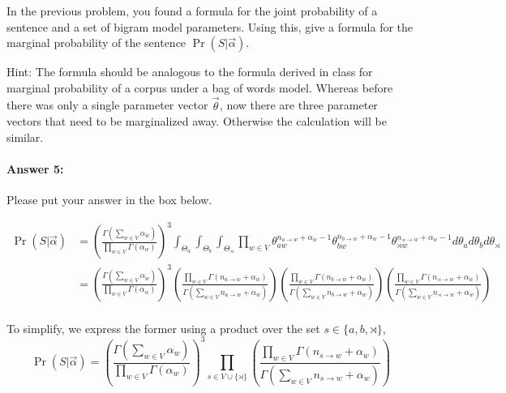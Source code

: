 \documentclass[10pt]{article}
\newenvironment{AnswerBox}{\begin{mdframed}[style=simple]}{\end{mdframed}}
\begin{document}
In the previous problem, you found a formula for the joint probability
of a sentence and a set of bigram model parameters. Using this, give a
formula for the marginal probability of the sentence
$\Pr(S|\vec{\alpha})$.

 Hint: The formula should be analogous to the formula derived
in class for marginal probability of a corpus under a bag of words
model. Whereas before there was only a single parameter vector
$\vec{\theta}$, now there are three parameter vectors that need to be
marginalized away. Otherwise the calculation will be similar.

\paragraph{Answer 5:} Please put your answer in the box below.


\begin{AnswerBox}%

\begin{align*}
    \Pr(S|\vec{\alpha}) & =  \left (\frac{\Gamma (\sum_{w\in V} \alpha_{w})}{\prod_{w\in V} \Gamma (\alpha_{w})}\right )^3 
    \int_{\Theta_{a}} \int_{\Theta_{b}} 
    \int_{\Theta_{\rtimes}} 
    \prod_{w\in V} \theta_{aw}^{n_{a \rightarrow w}+ \alpha_{w} -1} \theta_{bw}^{n_{b \rightarrow w}+\alpha_{w} -1} \theta_{\rtimes w}^{n_{\rtimes \rightarrow w}+\alpha_{w} -1}d\theta_a d\theta_b d\theta_{\rtimes}\\
    & = \left (\frac{\Gamma (\sum_{w\in V} \alpha_{w})}{\prod_{w\in V} \Gamma (\alpha_{w})}\right )^3 
    \left (\frac{\prod_{w\in V} \Gamma (n_{a \rightarrow w}+ \alpha_{w})}{\Gamma (\sum_{w\in V} n_{a \rightarrow w}+ \alpha_{w})}\right)
    \left (\frac{\prod_{w\in V} \Gamma (n_{b \rightarrow w}+ \alpha_{w})}{\Gamma (\sum_{w\in V} n_{b \rightarrow w}+ \alpha_{w})}\right)
    \left (\frac{\prod_{w\in V} \Gamma(n_{\rtimes \rightarrow w}+ \alpha_{w})}{\Gamma (\sum_{w\in V} n_{\rtimes \rightarrow w}+ \alpha_{w})}\right)\\ 
\end{align*}

To simplify, we express the former using a product over the set $s \in \{a,b,\rtimes \}$,
\begin{equation}\label{eq:marginal_data}
      \Pr(S|\vec{\alpha})  = \left (\frac{\Gamma (\sum_{w\in V} \alpha_{w})}{\prod_{w\in V} \Gamma (\alpha_{w})}\right )^3 
    \prod_{s\in V\cup \{\rtimes\}} \left (\frac{\prod_{w\in V} \Gamma (n_{s \rightarrow w}+ \alpha_{w})}{\Gamma (\sum_{w\in V} n_{s \rightarrow w}+ \alpha_{w})}\right)
\end{equation}

    
\end{AnswerBox}%
\end{document}
